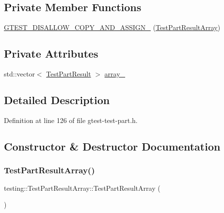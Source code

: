\subsection*{Private Member Functions}
\begin{DoxyCompactItemize}
\item 
\hyperlink{classtesting_1_1TestPartResultArray_a2f4ea91cd0d12104d9a476a0f0c5b7fe}{G\+T\+E\+S\+T\+\_\+\+D\+I\+S\+A\+L\+L\+O\+W\+\_\+\+C\+O\+P\+Y\+\_\+\+A\+N\+D\+\_\+\+A\+S\+S\+I\+G\+N\+\_\+} (\hyperlink{classtesting_1_1TestPartResultArray}{Test\+Part\+Result\+Array})
\end{DoxyCompactItemize}
\subsection*{Private Attributes}
\begin{DoxyCompactItemize}
\item 
std\+::vector$<$ \hyperlink{classtesting_1_1TestPartResult}{Test\+Part\+Result} $>$ \hyperlink{classtesting_1_1TestPartResultArray_a288da4fd16773d079722d6824a63060f}{array\+\_\+}
\end{DoxyCompactItemize}


\subsection{Detailed Description}


Definition at line 126 of file gtest-\/test-\/part.\+h.



\subsection{Constructor \& Destructor Documentation}
\mbox{\label{classtesting_1_1TestPartResultArray_ac9bfc830989c5328d7ff2ba8fa3c072b}} 
\subsubsection{\texorpdfstring{Test\+Part\+Result\+Array()}{TestPartResultArray()}}
{\footnotesize\ttfamily testing\+::\+Test\+Part\+Result\+Array\+::\+Test\+Part\+Result\+Array (\begin{DoxyParamCaption}{ }\end{DoxyParamCaption})\hspace{0.3cm}{\ttfamily [inline]}}



